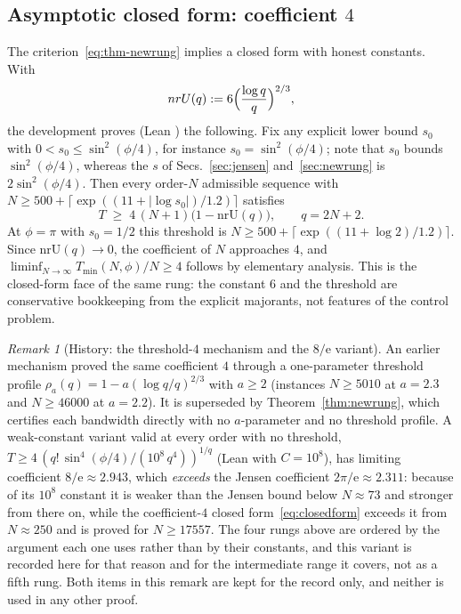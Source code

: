 \documentclass[%
  aps,
  pra,
  preprint,
  superscriptaddress,
  amsmath,amssymb,
  nofootinbib,
  floatfix,
]{revtex4-2}
\theoremstyle{definition}
\theoremstyle{remark}
\newtheorem{remark}[theorem]{Remark}
\DeclareRobustCommand{\lean}[1]{\path{#1}}
\begin{document}
\subsection{Asymptotic closed form: coefficient $4$}

The criterion~\eqref{eq:thm-newrung} implies a closed form with honest constants. With
\begin{equation}
\mathrm{nrU}(q):=6\Bigl(\frac{\log q}{q}\Bigr)^{2/3},
\label{eq:nrU}
\end{equation}
the development proves (Lean \lean{nr_closed_form}) the following. Fix any explicit lower bound
$s_0$ with $0<s_0\le\sin^2(\phi/4)$, for instance $s_0=\sin^2(\phi/4)$; note that $s_0$ bounds
$\sin^2(\phi/4)$, whereas the $s$ of Secs.~\ref{sec:jensen} and~\ref{sec:newrung} is
$2\sin^2(\phi/4)$. Then every order-$N$
admissible sequence with $N\ge500+\lceil\exp((11+|\log s_0|)/1.2)\rceil$ satisfies
\begin{equation}
\displaystyle
T\;\ge\;4\,(N+1)\bigl(1-\mathrm{nrU}(q)\bigr),
\qquad q=2N+2.
\label{eq:closedform}
\end{equation}
At $\phi=\pi$ with $s_0=1/2$ this threshold is $N\ge500+\lceil\exp((11+\log2)/1.2)\rceil$.
Since $\mathrm{nrU}(q)\to0$, the coefficient of $N$ approaches $4$, and
$\liminf_{N\to\infty}T_{\min}(N,\phi)/N\ge4$ follows by elementary analysis. This is the
closed-form face of the same rung: the constant $6$ and the threshold are conservative
bookkeeping from the explicit majorants, not features of the control problem.

\begin{remark}[History: the threshold-$4$ mechanism and the $8/\mathrm{e}$ variant]
An earlier mechanism proved the same coefficient $4$ through a one-parameter threshold
profile $\rho_a(q)=1-a(\log q/q)^{2/3}$ with $a\ge2$ (instances $N\ge5010$ at $a=2.3$ and
$N\ge46000$ at $a=2.2$). It is superseded by Theorem~\ref{thm:newrung}, which certifies
each bandwidth directly with no $a$-parameter and no threshold profile. A weak-constant
variant valid at every order with no threshold,
$T\ge4\,(q!\,\sin^4(\phi/4)/(10^8\,q^4))^{1/q}$ (Lean \lean{eight_over_e_bound} with
$C=10^8$), has limiting coefficient $8/\mathrm{e}\approx2.943$, which \emph{exceeds} the Jensen
coefficient $2\pi/\mathrm{e}\approx2.311$: because of its $10^8$ constant it is weaker than the
Jensen bound below $N\approx73$ and stronger from there on, while the coefficient-$4$ closed
form~\eqref{eq:closedform} exceeds it from $N\approx250$ and is proved for
$N\ge17557$. The four rungs above are ordered by the argument each one uses rather than by
their constants, and this variant is recorded here for that reason and for the intermediate
range it covers, not as a fifth rung. Both items in this remark are kept for the record only,
and neither is used in any other proof.
\end{remark}
\end{document}

